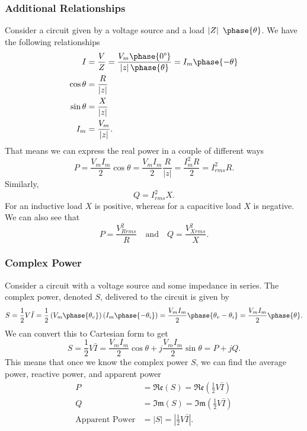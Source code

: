 \documentclass{article}
\begin{document}
\subsubsection{Additional Relationships}
Consider a circuit given by a voltage source and a load $\left| Z \right|\ \phase{\theta }$. We have the following relationships
\begin{align*}
    I &= \frac{V}{Z}=\frac{V_m\phase{0\degree}}{\left| z \right|\phase{\theta }}=I_m\phase{-\theta } \\
    \cos\theta &=\frac{R}{\left| z \right|}\\
    \sin\theta &=\frac{X}{\left| z \right|} \\
    I_m&=\frac{V_m}{\left| z \right|}.
\end{align*}
That means we can express the real power in a couple of different ways 
\[
    P=\frac{V_mI_m}{2}\cos\theta =\frac{V_mI_m}{2}\frac{R}{\left| z \right|}=\frac{I_m^2R}{2}=I_{rms}^2R.
\]
Similarly,
\[
    Q=I^2_{rms}X.
\]
For an inductive load $X$ is positive, whereas for a capacitive load $X$ is negative. We can also see that 
\[
    P=\frac{V_{Rrms}^2}{R}\quad \text{and}\quad Q=\frac{V_{Xrms}^2}{X}.
\]

\subsubsection{Complex Power}
Consider a circuit with a voltage source and some impedance in series. The complex power, denoted $S$, delivered to the circuit is given by 
\[
    S=\frac{1}{2}V\bar{I}=\frac{1}{2}\left( V_m\phase{\theta _v} \right)\left( I_m\phase{-\theta _i} \right)=\frac{V_mI_m}{2}\phase{\theta _v-\theta _i}=\frac{V_mI_m}{2}\phase{\theta}.
\]
We can convert this to Cartesian form to get 
\[
    S=\frac{1}{2}V\bar{I}=\frac{V_mI_m}{2}\cos\theta +j \frac{V_mI_m}{2}\sin\theta =P+jQ.
\]
This means that once we know the complex power $S$, we can find the average power, reactive power, and apparent power
\begin{align*}
    P &= \mathfrak{Re}(S)=\mathfrak{Re}\left( \frac{1}{2}V\bar{I} \right)\\
    Q&=\mathfrak{Im}(S)=\mathfrak{Im}\left( \frac{1}{2}V\bar{I} \right)\\
    \text{Apparent Power}&=\left| S \right|=\left| \frac{1}{2}V\bar{I} \right|.
\end{align*}
\end{document}
